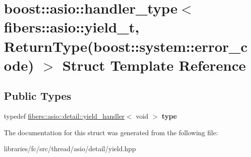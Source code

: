 \hypertarget{structboost_1_1asio_1_1handler__type_3_01fibers_1_1asio_1_1yield__t_00_01_return_type_07boost_1_1system_1_1error__code_08_01_4}{}\section{boost\+:\+:asio\+:\+:handler\+\_\+type$<$ fibers\+:\+:asio\+:\+:yield\+\_\+t, Return\+Type(boost\+:\+:system\+:\+:error\+\_\+code) $>$ Struct Template Reference}
\label{structboost_1_1asio_1_1handler__type_3_01fibers_1_1asio_1_1yield__t_00_01_return_type_07boost_1_1system_1_1error__code_08_01_4}
\subsection*{Public Types}
\begin{DoxyCompactItemize}
\item 
\mbox{\label{structboost_1_1asio_1_1handler__type_3_01fibers_1_1asio_1_1yield__t_00_01_return_type_07boost_1_1system_1_1error__code_08_01_4_ac3233e4a38fe0af807ba70c18fc6e685}} 
typedef \mbox{\hyperlink{classboost_1_1fibers_1_1asio_1_1detail_1_1yield__handler}{fibers\+::asio\+::detail\+::yield\+\_\+handler}}$<$ void $>$ {\bfseries type}
\end{DoxyCompactItemize}


The documentation for this struct was generated from the following file\+:\begin{DoxyCompactItemize}
\item 
libraries/fc/src/thread/asio/detail/yield.\+hpp\end{DoxyCompactItemize}
